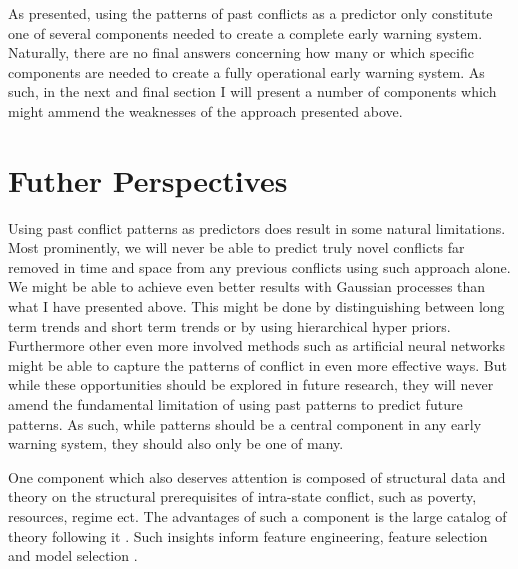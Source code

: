 \documentclass[a4paper]{article}
\begin{document}
As presented, using the patterns of past conflicts as a predictor only constitute one of several components needed to create a complete early warning system. Naturally, there are no final answers concerning how many or which specific components are needed to create a fully operational early warning system. As such, in the next and final section I will present a number of components which might ammend the weaknesses of the approach presented above.\par

\section{Futher Perspectives}

Using past conflict patterns as predictors does result in some natural limitations. Most prominently, we will never be able to predict truly novel conflicts far removed in time and space from any previous conflicts using such approach alone. We might be able to achieve even better results with Gaussian processes than what I have presented above. This might be done by distinguishing between long term trends and short term trends or by using hierarchical hyper priors. Furthermore other even more involved methods such as artificial neural networks might be able to capture the patterns of conflict in even more effective ways. But while these opportunities should be explored in future research, they will never amend the fundamental limitation of using past patterns to predict future patterns. As such, while patterns should be a central component in any early warning system, they should also only be one of many.\par


One component which also deserves attention is composed of structural data and theory on the structural prerequisites of intra-state conflict, such as poverty, resources, regime ect. The advantages of such a component is the large catalog of theory following it \citep{Collier_Hoeffler_1998, Fearon_Laitin_2003, Collier_Hoeffler_2004, Hegre_Sambanis_2006, Kalyvas_2007, Goldstone_2010, Cederman_Gleditsch_Buhaug_2013, perry_2013}. Such insights inform feature engineering, feature selection and model selection \cite[30]{Cederman_Gleditsch_Buhaug_2013}.\par
\end{document}
